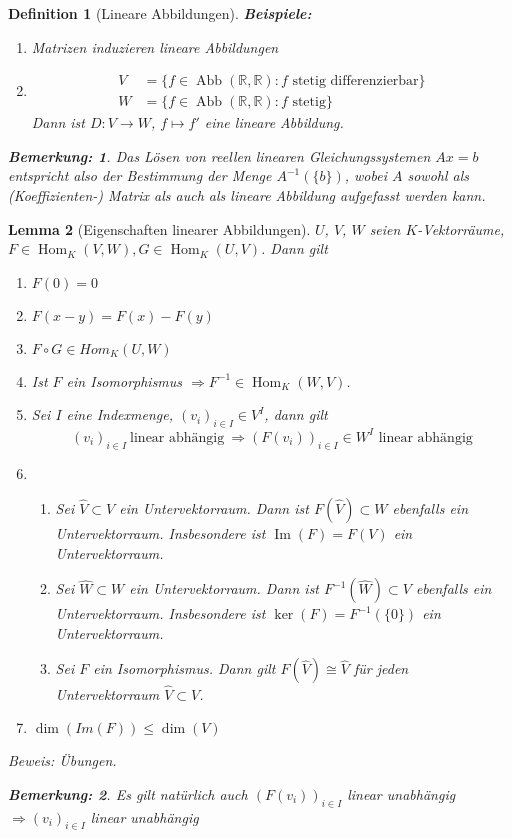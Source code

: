 \documentclass{report}
\newcommand{\R}{\mathbb{R}}
\DeclareMathOperator{\abb}{Abb}
\DeclareMathOperator{\Hom}{Hom}
\DeclareMathOperator{\Ima}{Im}
\theoremstyle{customrem}
\newtheorem*{bem}{Bemerkung\textnormal:}
\theoremstyle{customdef}
\newtheorem{definition}{Definition}[chapter]
\newtheorem{lemma}[definition]{Lemma}
\begin{document}
\begin{definition}[Lineare Abbildungen]
		\noindent\textbf{Beispiele: }
		\begin{enumerate}
			\item Matrizen induzieren lineare Abbildungen
			\item 
			\begin{align*}
				V &= \{f \in \abb(\R, \R) : f \text{ stetig differenzierbar}\}\\
				W &= \{f \in \abb(\R, \R) : f \text{ stetig}\}
			\end{align*}
			Dann ist $D : V \to W$, $f \mapsto f'$ eine lineare Abbildung.
		\end{enumerate}
		
		\begin{bem}
			Das Lösen von reellen linearen Gleichungssystemen $Ax = b$ entspricht also der Bestimmung der Menge $A^{-1}(\{b\})$, wobei $A$ sowohl als (Koeffizienten-) Matrix als auch als lineare Abbildung aufgefasst werden kann.
		\end{bem}
	\end{definition}

	\begin{lemma}[Eigenschaften linearer Abbildungen]
		\label{lem32}
		$U$, $V$, $W$ seien $K$-Vektorräume, $F \in \Hom_K(V,W), G \in \Hom_K(U, V)$. Dann gilt
		\begin{enumerate}
			\item $F(0) = 0$
			\item $F(x - y) = F(x) - F(y)$
			\item $F \circ G \in Hom_K(U, W)$
			\item Ist $F$ ein Isomorphismus $\Rightarrow F^{-1} \in \Hom_K(W, V)$.
			\item Sei $I$ eine  Indexmenge, $(v_i)_{i \in I} \in V^I$, dann gilt
				$$(v_i)_{i \in I}\ \text{linear abhängig} \ \Rightarrow (F(v_i))_{i \in I} \in W^I \text{ linear abhängig}$$
			\item 
				\begin{enumerate}
					\item Sei $\hat{V} \subset V$ ein Untervektorraum. Dann ist $F(\hat{V}) \subset W$  ebenfalls ein Untervektorraum. Insbesondere ist $\Ima(F) = F(V)$ ein Untervektorraum.
					\item Sei $\hat{W} \subset W$ ein Untervektorraum. Dann ist $F^{-1}(\hat{W}) \subset V$  ebenfalls ein Untervektorraum. Insbesondere ist $\ker(F) = F^{-1}(\{0\})$ ein Untervektorraum.
					\item Sei $F$ ein Isomorphismus. Dann gilt $F(\hat{V}) \cong \hat{V}$ für jeden Untervektorraum $\hat{V} \subset V$. 
				\end{enumerate}
			\item $\dim(Im(F)) \leq \dim(V)$
		\end{enumerate}
		Beweis: Übungen.\\
		\begin{bem}
			Es gilt natürlich auch $(F (v_i))_{i \in I}$ linear unabhängig $\Rightarrow (v_i)_{i \in I}$ linear unabhängig	
		\end{bem}
	\end{lemma}
	
\end{document}
